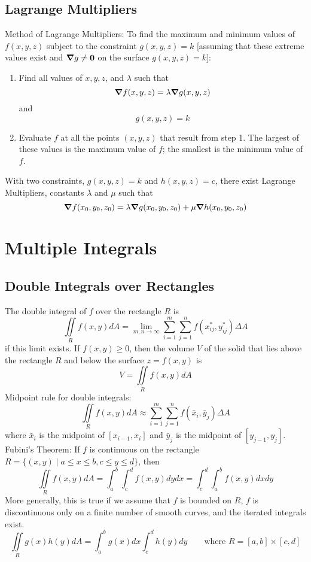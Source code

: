 \documentclass{article}
\begin{document}
\begin{multicols}{2}
    \subsection{Lagrange Multipliers}
    \begin{outline}
        \1 Method of Lagrange Multipliers: To find the maximum and minimum values of \(f(x,y,z)\) subject to the constraint \(g(x,y,z)=k\) [assuming that these extreme values exist and \(\grad{g}\neq \vb{0}\) on the surface \(g(x,y,z)=k\)]: 
        \begin{enumerate}
            \item Find all values of \(x,y,z\), and \(\lambda\) such that \[\grad f(x,y,z)=\lambda\grad g(x,y,z)\] and \[g(x,y,z)=k\]
            \item Evaluate $f$ at all the points \((x,y,z)\) that result from step 1. The largest of these values is the maximum value of $f$; the smallest is the minimum value of $f$. 
        \end{enumerate}

    \end{outline}
\end{multicols}
\begin{outline}
        \1 With two constraints, \(g(x,y,z)=k\) and \(h(x,y,z)=c\), there exist Lagrange Multipliers, constants \(\lambda\) and \(\mu\) such that \[\grad f(x_0,y_0,z_0)=\lambda\grad g(x_0,y_0,z_0)+\mu\grad h(x_0,y_0,z_0)\]
    \end{outline}

    \section{Multiple Integrals} %
    \subsection{Double Integrals over Rectangles} %
    \begin{outline}
        \1 The double integral of $f$ over the rectangle $R$ is \[\iint\limits_Rf(x,y)dA=\lim_{m,n\to\infty}\sum^m_{i=1}\sum^n_{j=1}f(x_{ij}^*,y_{ij}^*)\Delta A\] if this limit exists. 
        \1 If \(f(x,y)\geq 0\), then the volume $V$ of the solid that lies above the rectangle $R$ and below the surface \(z=f(x,y)\) is \[V=\iint\limits_Rf(x,y)dA\]
        \1 Midpoint rule for double integrals: \[\iint\limits_Rf(x,y)dA\approx\sum^m_{i=1}\sum^n_{j=1}f(\bar x_i,\bar y_j)\Delta A\] where \(\bar x_i\) is the midpoint of \([x_{i-1},x_i]\) and \(\bar y_j\) is the midpoint of \([y_{j-1},y_j]\). 
        \1 Fubini's Theorem: If $f$ is continuous on the rectangle \(R=\{(x,y)\;|\;a\leq x\leq b,c\leq y\leq d\}\), then \[\iint\limits_Rf(x,y)dA=\int^b_a\int^d_cf(x,y)dydx=\int^d_c\int^b_af(x,y)dxdy\] More generally, this is true if we assume that $f$ is bounded on $R$, $f$ is discontinuous only on a finite number of smooth curves, and the iterated integrals exist. 
        \1 \[\iint\limits_Rg(x)h(y)dA=\int^b_ag(x)dx\int^d_ch(y)dy\qquad\text{where }R=[a,b]\times[c,d]\]

    \end{outline}
\end{document}
